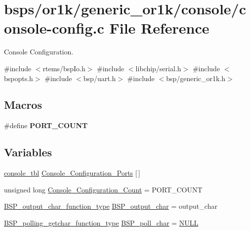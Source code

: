 \hypertarget{or1k_2generic__or1k_2console_2console-config_8c}{}\section{bsps/or1k/generic\+\_\+or1k/console/console-\/config.c File Reference}
\label{or1k_2generic__or1k_2console_2console-config_8c}


Console Configuration.  


{\ttfamily \#include $<$rtems/bsp\+Io.\+h$>$}\newline
{\ttfamily \#include $<$libchip/serial.\+h$>$}\newline
{\ttfamily \#include $<$bspopts.\+h$>$}\newline
{\ttfamily \#include $<$bsp/uart.\+h$>$}\newline
{\ttfamily \#include $<$bsp/generic\+\_\+or1k.\+h$>$}\newline
\subsection*{Macros}
\begin{DoxyCompactItemize}
\item 
\#define {\bfseries P\+O\+R\+T\+\_\+\+C\+O\+U\+NT}
\end{DoxyCompactItemize}
\subsection*{Variables}
\begin{DoxyCompactItemize}
\item 
\mbox{\hyperlink{struct__console__tbl}{console\+\_\+tbl}} \mbox{\hyperlink{or1k_2generic__or1k_2console_2console-config_8c_a8d1404b49209c3692a3dc1433710e550}{Console\+\_\+\+Configuration\+\_\+\+Ports}} \mbox{[}$\,$\mbox{]}
\item 
unsigned long \mbox{\hyperlink{or1k_2generic__or1k_2console_2console-config_8c_a59f0ae8f9904bd193825ccfc2c99aeb6}{Console\+\_\+\+Configuration\+\_\+\+Count}} = P\+O\+R\+T\+\_\+\+C\+O\+U\+NT
\item 
\mbox{\hyperlink{bspIo_8h_a0b0dff1c3d35110ae303b4098c60dc14}{B\+S\+P\+\_\+output\+\_\+char\+\_\+function\+\_\+type}} \mbox{\hyperlink{or1k_2generic__or1k_2console_2console-config_8c_a5fb8c9c4f076f0340b4a17ed432ced5c}{B\+S\+P\+\_\+output\+\_\+char}} = output\+\_\+char
\item 
\mbox{\hyperlink{bspIo_8h_a132b9ceff428a634ece5dfaac7ef1006}{B\+S\+P\+\_\+polling\+\_\+getchar\+\_\+function\+\_\+type}} \mbox{\hyperlink{or1k_2generic__or1k_2console_2console-config_8c_ae5846eecdfa8f2813504371bf01c29b0}{B\+S\+P\+\_\+poll\+\_\+char}} = \mbox{\hyperlink{bestcomm__api_8h_a872bb74de61c3689ccd5b41873fce42c}{N\+U\+LL}}
\end{DoxyCompactItemize}


